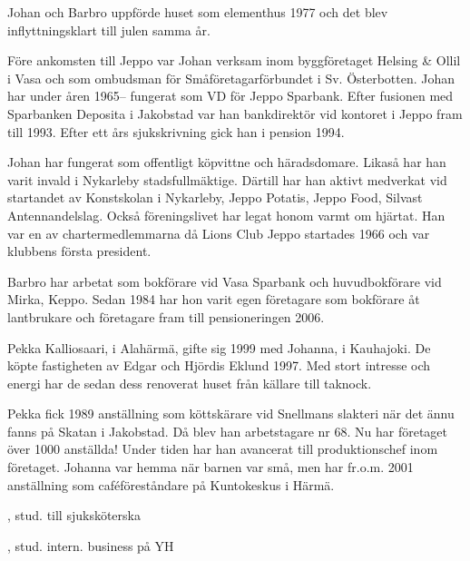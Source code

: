Johan och Barbro uppförde huset som elementhus 1977 och det blev inflyttningsklart till julen samma år.

Före ankomsten till Jeppo var Johan verksam inom byggföretaget Helsing \& Ollil i Vasa och som ombudsman för Småföretagarförbundet i Sv. Österbotten. Johan har under åren 1965-- fungerat som VD för Jeppo Sparbank. Efter fusionen med Sparbanken Deposita i Jakobstad var han bankdirektör vid kontoret i Jeppo fram till 1993. Efter ett års sjukskrivning gick han i pension 1994.

Johan har fungerat som offentligt köpvittne och häradsdomare.	Likaså har han varit invald i Nykarleby stadsfullmäktige. Därtill har	han aktivt medverkat vid startandet av Konstskolan i Nykarleby,	Jeppo Potatis, Jeppo Food, Silvast Antennandelslag. Också föreningslivet har legat honom varmt om hjärtat. Han var en av chartermedlemmarna då Lions Club Jeppo startades 1966 och var klubbens första president.

Barbro har arbetat som bokförare vid Vasa Sparbank och huvudbokförare vid Mirka, Keppo. Sedan 1984 har hon varit egen företagare som bokförare åt lantbrukare och företagare fram till pensioneringen 2006.






Pekka Kalliosaari,  i Alahärmä, gifte sig 1999 med Johanna,  i Kauhajoki. De köpte fastigheten av Edgar och Hjördis Eklund 1997. Med stort intresse och energi har de sedan dess renoverat huset från källare till taknock.

Pekka fick 1989 anställning som köttskärare vid Snellmans slakteri när det ännu fanns på Skatan i Jakobstad. Då blev han arbetstagare nr 68. Nu har företaget över 1000 anställda! Under tiden har han avancerat till produktionschef inom företaget. Johanna var hemma när barnen var små, men har fr.o.m. 2001	anställning som caféföreståndare på Kuntokeskus i Härmä.
\begin{jhchildren}
  \item {}, stud. till sjuksköterska
  \item {}, stud. intern. business på YH
  \item {}
\end{jhchildren}


